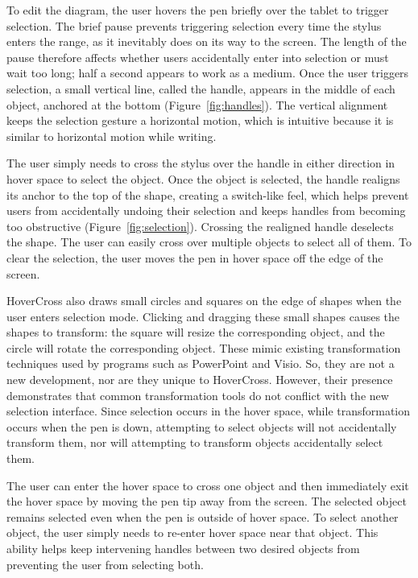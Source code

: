 \documentclass{article}
\begin{document}
To edit the diagram, the user hovers the pen briefly over the tablet
to trigger selection.  The brief pause prevents triggering selection
every time the stylus enters the range, as it inevitably does on its
way to the screen.  The length of the pause therefore affects whether users accidentally enter into selection or must wait too long; half a second appears to work as a medium.  Once the user triggers selection, a small vertical line, called the handle,
appears in the middle of each object, anchored at the bottom (Figure~\ref{fig:handles}).  The vertical alignment keeps the selection gesture a horizontal motion, which is intuitive because it is similar to horizontal motion while writing.

The user simply needs to cross the stylus over the handle in either
direction in hover space to select the object.  Once the object is selected, the handle 
realigns its anchor to the top of the shape, creating a switch-like
feel, which helps prevent users from accidentally undoing their selection and keeps
handles from becoming too obstructive (Figure~\ref{fig:selection}).  Crossing the realigned handle
deselects the shape.  The user can easily cross over multiple objects to select all
of them.  To clear the selection, the user moves the pen in hover
space off the edge of the screen.

HoverCross also draws small circles and squares on the edge of shapes when the user enters selection mode.  Clicking and dragging these small shapes causes the shapes to transform: the square will resize the corresponding object, and the circle will rotate the corresponding object.  These mimic existing transformation techniques used by programs such as PowerPoint and Visio.  So, they are not a new development, nor are they unique to HoverCross.  However, their presence demonstrates that common transformation tools do not conflict with the new selection interface.  Since selection occurs in the hover space, while transformation occurs when the pen is down, attempting to select objects will not accidentally transform them, nor will attempting to transform objects accidentally select them.

The user can enter the hover
space to cross one object and then immediately exit the hover space by
moving the pen tip away from the screen.  The selected object remains
selected even when the pen is outside of hover space.  To select
another object, the user simply needs to re-enter hover space near
that object.  This ability helps keep intervening handles between two
desired objects from preventing the user from selecting both.
\end{document}
